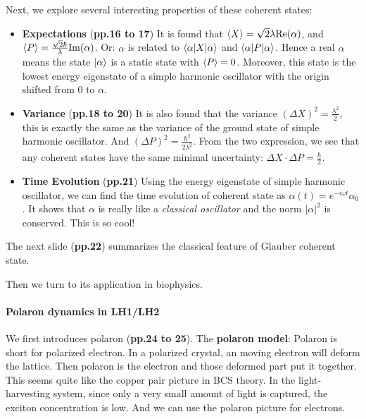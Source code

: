 \documentclass{article}
\numberwithin{equation}{subsection} %
\theoremstyle{definition}
\begin{document}
Next, we explore several interesting properties of these coherent
states:
\begin{itemize}
    \item \textbf{Expectations}
        (\textbf{pp.16 to 17}) It is found that 
        $\braket{X}=\sqrt{2}\lambda \text{Re}(\alpha)$,
        and $\braket{P} = \frac{\sqrt{2}\hbar}{\lambda} \text{Im}(\alpha)$. Or:
        $\alpha$ is related to $\braket{\alpha|X|\alpha}$
        and $\braket{\alpha|P|\alpha}$. Hence a real $\alpha$ means the state
        $\ket{\alpha}$ is a static state with $\braket{P}=0$. Moreover, this 
        state
        is the lowest energy eigenstate of a simple harmonic oscillator with
        the origin shifted from $0$ to $\alpha$. 
    \item \textbf{Variance}
        (\textbf{pp.18 to 20})
        It is also found that the variance 
        $(\Delta X)^2 = \frac{\lambda^2}{2}$,
        this is exactly the same as the variance of the ground state of simple
        harmonic oscillator.
        And $(\Delta P)^2 = \frac{\hbar^2}{2\lambda^2}$. 
        From the two expression,
        we see that any coherent states have the same minimal uncertainty:
        $\Delta X \cdot \Delta P = \frac{\hbar}{2}$.
    \item \textbf{Time Evolution}
        (\textbf{pp.21})
        Using the energy eigenstate of simple harmonic oscillator, we can find 
        the time evolution of coherent state as 
        $\alpha(t) = e^{-i\omega t} \alpha_0$. It shows that $\alpha$ is really
        like a \textit{classical oscillator} and the norm $|\alpha|^2$ is conserved. 
        This is so cool!
\end{itemize}

The next slide (\textbf{pp.22}) summarizes the classical feature of Glauber coherent state.

Then we turn to its application in biophysics.
\paragraph{Polaron dynamics in LH1/LH2} We first introduces polaron
(\textbf{pp.24 to 25}). The \textbf{polaron model}: Polaron
is short for polarized electron. In a polarized crystal, an moving electron
will deform the lattice. Then polaron is the electron and those deformed
part put it together. This seems quite like the copper pair picture in
BCS theory. In the light-harvesting system, since only a very small
amount of light is captured, the exciton concentration is low. And we can
use the polaron picture for electrons.
\end{document}
